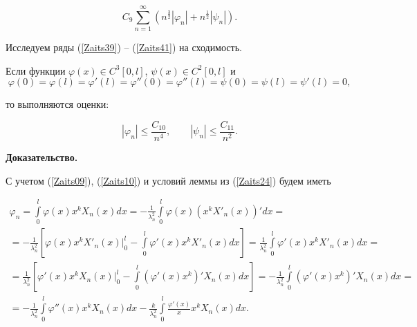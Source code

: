 \begin{equation}

\label{Zaits41}

C_9\sum\limits_{n=1}^\infty \left(n^{\frac32}|\varphi_n|+n^{\frac12}|\psi_n|\right).

\end{equation}



Исследуем ряды (\ref{Zaits39}) -- (\ref{Zaits41}) на сходимость.

\begin{lemma}[3]

Если функции $\varphi(x)\in C^3[0,l]$, $\psi(x)\in C^2[0,l]$ и $$\varphi(0)=\varphi(l)=\varphi'(l)=\varphi''(0)=\varphi''(l)=\psi(0)=\psi(l)=\psi'(l)=0,$$

то выполняются оценки:

\begin{equation}

\label{Zaits42}

|\varphi_n|\leq\frac{C_{10}}{n^4},\qquad |\psi_n|\leq\frac{C_{11}}{n^2}.

\end{equation}

\end{lemma}



\textbf{Доказательство.}



С учетом (\ref{Zaits09}), (\ref{Zaits10}) и условий леммы из (\ref{Zaits24}) будем иметь

\begin{multline*}

\varphi_n=\int\limits_0^l\varphi(x)x^kX_n(x)dx=-\frac{1}{\lambda_n^2}\int\limits_0^l\varphi(x)(x^kX'_n(x))'dx=\\

=-\frac{1}{\lambda_n^2}\left[\varphi(x)x^kX'_n(x)\Bigr|_0^l-\int\limits_0^l\varphi'(x)x^kX'_n(x)dx\right]=\frac{1}{\lambda_n^2}\int\limits_0^l\varphi'(x)x^kX'_n(x)dx=\\

=\frac{1}{\lambda_n^2}\left[\varphi'(x)x^kX_n(x)\Bigr|_0^l-\int\limits_0^l(\varphi'(x)x^k)'X_n(x)dx\right]=-\frac{1}{\lambda_n^2}\int\limits_0^l(\varphi'(x)x^k)'X_n(x)dx=\\

=-\frac{1}{\lambda_n^2}\int\limits_0^l\varphi''(x)x^kX_n(x)dx-\frac{k}{\lambda_n^2}\int\limits_0^l\frac{\varphi'(x)}{x}x^kX_n(x)dx.

\end{multline*}



